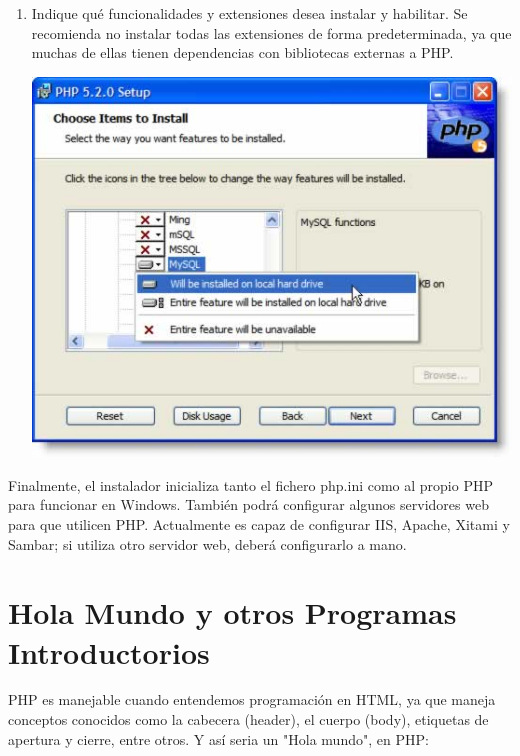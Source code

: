 \documentclass[11pt]{article} %
\begin{document}
\begin{enumerate}
\item Indique qué funcionalidades y extensiones desea instalar y habilitar. Se recomienda no instalar todas las extensiones de forma predeterminada, ya que muchas de ellas tienen dependencias con bibliotecas externas a PHP.
\begin{center}
\includegraphics{Imagenes/install03.jpg}
\end{center}
\end{enumerate}

Finalmente, el instalador inicializa tanto el fichero php.ini como al propio PHP para funcionar en Windows. También podrá configurar algunos servidores web para que utilicen PHP. Actualmente es capaz de configurar IIS, Apache, Xitami y Sambar; si utiliza otro servidor web, deberá configurarlo a mano.

\section{Hola Mundo y otros Programas Introductorios}
PHP es manejable cuando entendemos programación en HTML, ya que maneja conceptos conocidos como la cabecera (header), el cuerpo (body), etiquetas de apertura y cierre, entre otros. Y así seria un "Hola mundo", en PHP:
\end{document}
